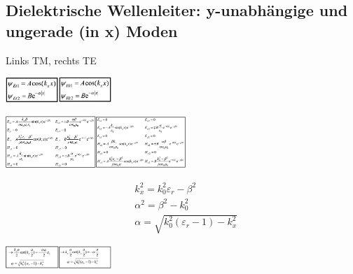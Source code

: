 \documentclass[english]{latex4ei/latex4ei_sheet}
\begin{document}
\begin{sectionbox}
    \subsection{Dielektrische Wellenleiter: y-unabhängige und ungerade (in x) Moden}
    Links TM, rechts TE\\
    \begin{center}\includegraphics[width = 2cm]{./img/dielektr-ugtm.png}\includegraphics[width = 2cm]{./img/dielektr-ugte.png}\end{center}
    \begin{center}\includegraphics[width = 3.4cm]{./img/dielektr-ugtm2.png}\includegraphics[width = 3.4cm]{./img/dielektr-ugte2.png}\end{center}
    $$\begin{aligned}
             & k_{x}^{2}=k_{0}^{2} \varepsilon_{r}-\beta^{2}                   \\
             & \alpha^{2}=\beta^{2}-k_{0}^{2}                                  \\
             & \alpha=\sqrt{k_{0}^{2}\left(\varepsilon_{r}-1\right)-k_{x}^{2}}
        \end{aligned}$$
    \begin{center}\includegraphics[width = 2cm]{./img/dielektr-ugtm3.png}\includegraphics[width = 2cm]{./img/dielektr-ugte3.png}\end{center}

\end{sectionbox}
\end{document}
